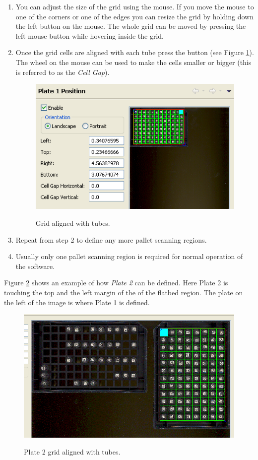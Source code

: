 \begin{enumerate}
  \item You can adjust the size of the grid using the mouse. If you move the
    mouse to one of the corners or one of the edges you can resize the grid by
    holding down the left button on the mouse. The whole grid can be moved by
    pressing the left mouse button while hovering inside the grid.
  \item Once the grid cells are aligned with each tube press the  button
    (see Figure \ref{fig:plate1_grid_ready}). The wheel on the mouse can be
    used to make the cells smaller or bigger (this is referred to as the
    \emph{Cell Gap}).
    \begin{figure}[H]
      \centering
      \scalebox{0.75}
      { \includegraphics*{screenshots/configuration/plate1_grid_ready} }
      \caption{Grid aligned with tubes.}
      \label{fig:plate1_grid_ready}
    \end{figure}
  \item Repeat from step 2 to define any more pallet scanning regions.
  \item Usually only one pallet scanning region is required for normal
    operation of the software.
\end{enumerate}
Figure \ref{fig:plate2_grid_ready} shows an example of how \emph{Plate 2} can
be defined. Here Plate 2 is touching the top and the left margin of
the of the flatbed region. The plate on the left of the image is where Plate 1
is defined.
    \begin{figure}[H]
      \centering
      \scalebox{0.5}
      { \includegraphics*{screenshots/configuration/plate2_grid_ready} }
      \caption{Plate 2 grid aligned with tubes.}
      \label{fig:plate2_grid_ready}
    \end{figure}
